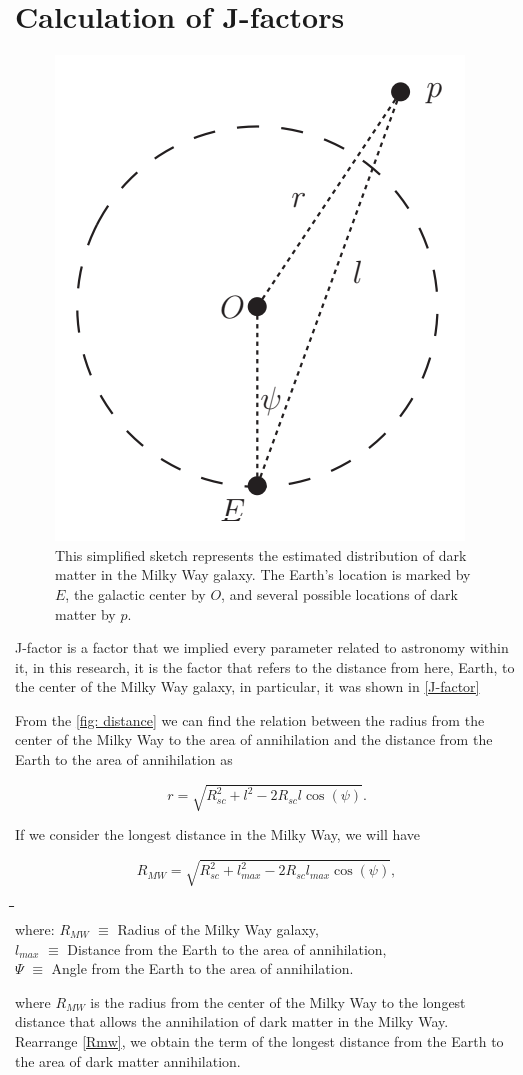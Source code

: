 \documentclass[10pt, oneside]{book}
\numberwithin{equation}{chapter}
\begin{document}
\section{Calculation of J-factors}%
\begin{figure}
    \centering
    \includegraphics[width=0.3\linewidth]{images/distance.PNG}
    \caption{This simplified sketch represents the estimated distribution of dark matter in the Milky Way galaxy. The Earth's location is marked by $E$, the galactic center by $O$, and several possible locations of dark matter by $p$.}
    \label{fig: distance}
\end{figure}
J-factor is a factor that we implied every parameter related to astronomy within it, in this research, it is the factor that refers to the distance from here, Earth, to the center of the Milky Way galaxy, in particular, it was shown in \autoref{J-factor}

From the \autoref{fig: distance} we can find the relation between the radius from the center of the Milky Way to the area of annihilation and the distance from the Earth to the area of annihilation as

\begin{equation}\label{r}
	r=\sqrt{R_{sc}^2+l^2-2R_{sc}l\cos(\psi)}.
\end{equation}

\noindent If we consider the longest distance in the Milky Way, we will have

\begin{equation}\label{Rmw}
    R_{MW}=\sqrt{R_{sc}^2+l_{max}^2-2R_{sc}l_{max}\cos(\psi)},
\end{equation}

\begin{tabbing}
    \indent \= \indent \= \indent \= \indent \= \indent\= \indent\= \\
    where:
    \>\>\> $R_{MW}$ \>\> $\equiv$ \> Radius of the Milky Way galaxy,\\
    \>\>\> $l_{max}$ \>\> $\equiv$ \> Distance from the Earth to the area of annihilation,\\
    \>\>\> $\Psi$ \>\> $\equiv$ \> Angle from the Earth to the area of annihilation. 
\end{tabbing}
where $R_{MW}$ is the radius from the center of the Milky Way to the longest distance that allows the annihilation of dark matter in the Milky Way.\\
Rearrange \autoref{Rmw}, we obtain the term of the longest distance from the Earth to the area of dark matter annihilation.
\end{document}
